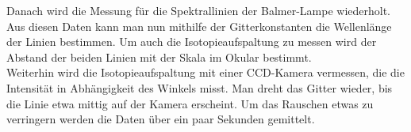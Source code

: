 Danach wird die Messung für die Spektrallinien der Balmer-Lampe wiederholt. Aus diesen Daten kann man nun mithilfe der Gitterkonstanten die Wellenlänge der Linien bestimmen. Um auch die Isotopieaufspaltung zu messen wird der Abstand der beiden Linien mit der Skala im Okular bestimmt.\\

Weiterhin wird die Isotopieaufspaltung mit einer CCD-Kamera vermessen, die die Intensität in Abhängigkeit des Winkels misst. Man dreht das Gitter wieder, bis die Linie etwa mittig auf der Kamera erscheint. Um das Rauschen etwas zu verringern werden die Daten über ein paar Sekunden gemittelt.